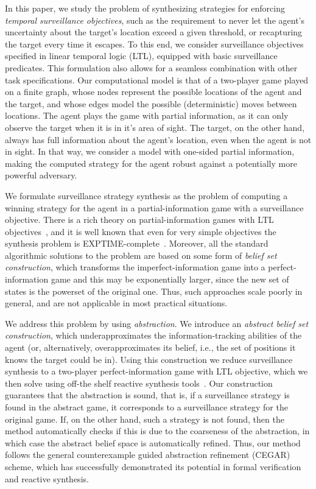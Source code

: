 In this paper, we study the problem of synthesizing strategies for enforcing \emph{temporal surveillance objectives}, such as the requirement to never let the agent's uncertainty about the target's location exceed a given threshold, or recapturing the target every time it escapes. To this end, we consider surveillance objectives specified in linear temporal logic (LTL), equipped with basic surveillance predicates. This formulation also allows for a seamless combination with other task specifications. Our computational model is that of a two-player game played on a finite graph, whose nodes represent the possible locations of the agent and the target, and whose edges model the possible (deterministic) moves between locations. The agent plays the game with partial information, as it can only observe the target when  it is in it's area of sight. The target, on the other hand, always has full information about the agent's location, even when the agent is not in sight. In that way, we consider a model with one-sided partial information, making the computed strategy for the agent robust against a potentially more powerful adversary. 

We formulate surveillance strategy synthesis as the problem of computing a winning strategy for the agent in a partial-information game with a surveillance objective. There is a rich theory on partial-information games with LTL objectives~\cite{DoyenR11,Chatterjee2013}, and it is well known that even for very simple objectives the synthesis problem is EXPTIME-complete~\cite{Reif84,BerwangerD08}. Moreover, all the standard algorithmic solutions to the problem are based on some form of \emph{belief set construction}, which transforms the imperfect-information game into a perfect-information game and this may be exponentially larger, since the new set of states is the powerset of the original one. Thus, such approaches scale poorly in general, and are not applicable in most practical situations.

We address this problem by using \emph{abstraction}. We introduce an \emph{abstract belief set construction}, which underapproximates the information-tracking abilities of the agent (or, alternatively, overapproximates its belief, i.e., the set of positions it knows the target could be in). Using this construction we reduce surveillance synthesis to a two-player perfect-information game with LTL objective, which we then solve using off-the shelf reactive synthesis tools~\cite{EhlersR16}. Our construction guarantees that the abstraction is sound, that is, if a surveillance strategy is found in the abstract game, it corresponds to a surveillance strategy for the original game. If, on the other hand, such a strategy is not found, then the method automatically checks if this is due to the coarseness of the abstraction, in which case the abstract belief space is automatically refined. Thus, our method follows the general counterexample guided abstraction refinement (CEGAR)~\cite{ClarkeGJLV00} scheme, which has successfully demonstrated its potential in formal verification and reactive synthesis.

